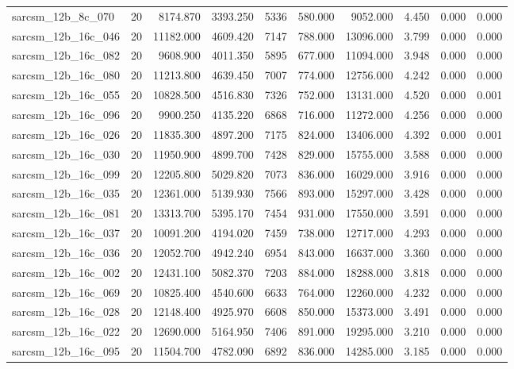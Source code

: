 \begin{tabular}{lrrrrrrrrr}
sarcsm\_12b\_8c\_070 & 20 & 8174.870 & 3393.250 & 5336 & 580.000 & 9052.000 & 4.450 & 0.000 & 0.000 \\
sarcsm\_12b\_16c\_046 & 20 & 11182.000 & 4609.420 & 7147 & 788.000 & 13096.000 & 3.799 & 0.000 & 0.000 \\
sarcsm\_12b\_16c\_082 & 20 & 9608.900 & 4011.350 & 5895 & 677.000 & 11094.000 & 3.948 & 0.000 & 0.000 \\
sarcsm\_12b\_16c\_080 & 20 & 11213.800 & 4639.450 & 7007 & 774.000 & 12756.000 & 4.242 & 0.000 & 0.000 \\
sarcsm\_12b\_16c\_055 & 20 & 10828.500 & 4516.830 & 7326 & 752.000 & 13131.000 & 4.520 & 0.000 & 0.001 \\
sarcsm\_12b\_16c\_096 & 20 & 9900.250 & 4135.220 & 6868 & 716.000 & 11272.000 & 4.256 & 0.000 & 0.000 \\
sarcsm\_12b\_16c\_026 & 20 & 11835.300 & 4897.200 & 7175 & 824.000 & 13406.000 & 4.392 & 0.000 & 0.001 \\
sarcsm\_12b\_16c\_030 & 20 & 11950.900 & 4899.700 & 7428 & 829.000 & 15755.000 & 3.588 & 0.000 & 0.000 \\
sarcsm\_12b\_16c\_099 & 20 & 12205.800 & 5029.820 & 7073 & 836.000 & 16029.000 & 3.916 & 0.000 & 0.000 \\
sarcsm\_12b\_16c\_035 & 20 & 12361.000 & 5139.930 & 7566 & 893.000 & 15297.000 & 3.428 & 0.000 & 0.000 \\
sarcsm\_12b\_16c\_081 & 20 & 13313.700 & 5395.170 & 7454 & 931.000 & 17550.000 & 3.591 & 0.000 & 0.000 \\
sarcsm\_12b\_16c\_037 & 20 & 10091.200 & 4194.020 & 7459 & 738.000 & 12717.000 & 4.293 & 0.000 & 0.000 \\
sarcsm\_12b\_16c\_036 & 20 & 12052.700 & 4942.240 & 6954 & 843.000 & 16637.000 & 3.360 & 0.000 & 0.000 \\
sarcsm\_12b\_16c\_002 & 20 & 12431.100 & 5082.370 & 7203 & 884.000 & 18288.000 & 3.818 & 0.000 & 0.000 \\
sarcsm\_12b\_16c\_069 & 20 & 10825.400 & 4540.600 & 6633 & 764.000 & 12260.000 & 4.232 & 0.000 & 0.000 \\
sarcsm\_12b\_16c\_028 & 20 & 12148.400 & 4925.970 & 6608 & 850.000 & 15373.000 & 3.491 & 0.000 & 0.000 \\
sarcsm\_12b\_16c\_022 & 20 & 12690.000 & 5164.950 & 7406 & 891.000 & 19295.000 & 3.210 & 0.000 & 0.000 \\
sarcsm\_12b\_16c\_095 & 20 & 11504.700 & 4782.090 & 6892 & 836.000 & 14285.000 & 3.185 & 0.000 & 0.000 \\

\end{tabular}
